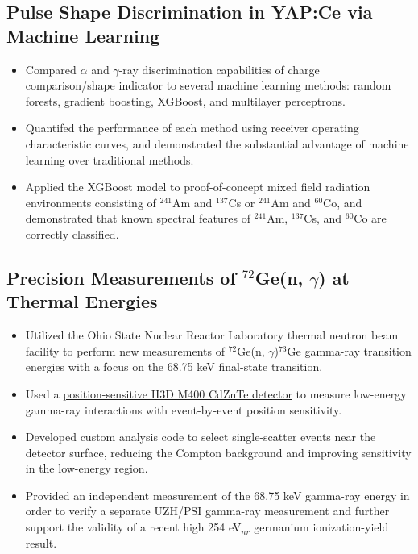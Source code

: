 \subsection{Pulse Shape Discrimination in YAP:Ce via Machine Learning}
\begin{minipage}[t]{\textwidth}
	\begin{small}
		\begin{itemize}
			\item Compared $\alpha$ and $\gamma$-ray discrimination capabilities of charge comparison/shape indicator to several machine learning methods: random forests, gradient boosting, XGBoost, and multilayer perceptrons.
			\item Quantifed the performance of each method using receiver operating characteristic curves, and demonstrated the substantial advantage of machine learning over traditional methods.
			\item Applied the XGBoost model to proof-of-concept mixed field radiation environments consisting of $^{241}$Am and $^{137}$Cs or $^{241}$Am and $^{60}$Co, and demonstrated that known spectral features of $^{241}$Am, $^{137}$Cs, and $^{60}$Co are correctly classified.
		\end{itemize}
	\end{small}
\end{minipage}
\subsection{Precision Measurements of \texorpdfstring{$^{72}$Ge(n, $\gamma$)}{72Ge(n,gamma)} at Thermal Energies}
\begin{minipage}[t]{\textwidth}
	\begin{small}
		\begin{itemize}
			\item Utilized the Ohio State Nuclear Reactor Laboratory thermal neutron beam facility to perform new measurements of $^{72}$Ge(n, $\gamma$)$^{73}$Ge gamma-ray transition energies with a focus on the 68.75 keV final-state transition.
			\item Used a \href{https://h3dgamma.com/m400.php}{position-sensitive H3D M400 CdZnTe detector} to measure low-energy gamma-ray interactions with event-by-event position sensitivity.
			\item Developed custom analysis code to select single-scatter events near the detector surface, reducing the Compton background and improving sensitivity in the low-energy region.
			\item Provided an independent measurement of the 68.75 keV gamma-ray energy in order to verify a separate UZH/PSI gamma-ray measurement and further support the validity of a recent high 254 eV$_{nr}$ germanium ionization-yield result.
		\end{itemize}
	\end{small}
\end{minipage}

